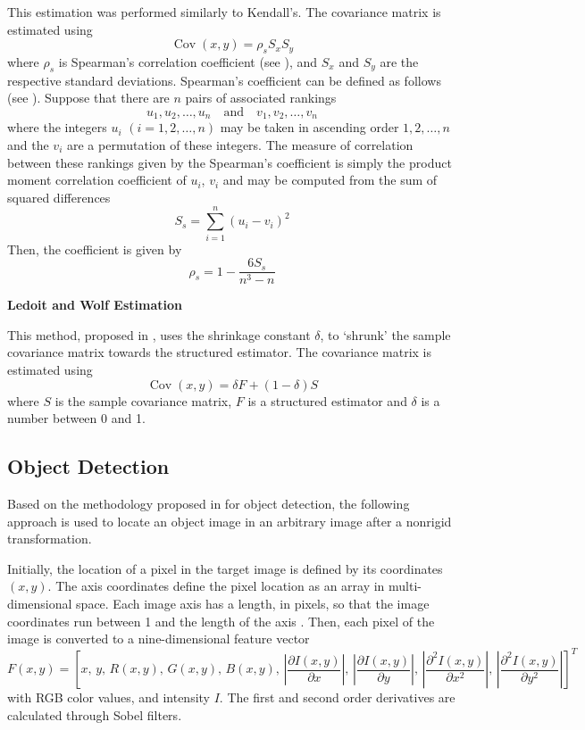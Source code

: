 \documentclass[11pt]{article}
\theoremstyle{definition}
\theoremstyle{remark}
\theoremstyle{remark}
\theoremstyle{remark}
\begin{document}
This estimation was performed similarly to Kendall's. The covariance matrix is
estimated using
%
\[
  \operatorname{Cov}(x, y)=\rho_{s} S_{x} S_{y}
\]
%
where $\rho_{s}$ is Spearman's correlation coefficient (see
\parencite{spearman1961general}), and $S_{x}$ and $S_{y}$ are the respective
standard deviations. Spearman's coefficient can be defined as follows (see
\cite{spearmscoeff}). Suppose that there are $n$ pairs of associated rankings
%
\[
u_{1}, u_{2}, \ldots, u_{n} \quad \text{and} \quad v_{1}, v_{2}, \ldots, v_{n}
\]
%
where the integers $u_{i}$ $(i = 1,2,\ldots,n)$ may be taken in ascending order
$1,2,\ldots,n$ and the $v_{i}$ are a permutation of these integers. The measure
of correlation between these rankings given by the Spearman's coefficient is
simply the product moment correlation coefficient of $u_{i}$, $v_{i}$ and may be
computed from the sum of squared differences
%
\[
  S_{s} = \sum_{i = 1}^{n} (u_{i} - v_{i})^{2}
\]
%
Then, the coefficient is given by
%
\[
\rho_{s} = 1 - \dfrac{6S_{s}}{n^{3} - n}
\]

\textbf{Ledoit and Wolf Estimation}

This method, proposed in \parencite{ledoit2004honey}, uses the shrinkage
constant $\delta$, to ‘shrunk’ the sample covariance matrix towards the
structured estimator. The covariance matrix is estimated using
%
\[
\operatorname{Cov}(x, y)={\delta} F+\left(1-{\delta}\right)S
\]
%
where $S$ is the sample covariance matrix, $F$ is a structured estimator and
$\delta$ is a number between 0 and 1.


\subsection{Object Detection}
Based on the methodology proposed in \parencite{tuzel2006} for object detection,
the following approach is used to locate an object image in an arbitrary image
after a nonrigid transformation.

Initially, the location of a pixel in the target image is defined by its
coordinates $(x,y)$. The axis coordinates define the pixel location as an array
in multi-dimensional space. Each image axis has a length, in pixels, so that the
image coordinates run between 1 and the length of the axis
\parencite{mikhail1984detection}. Then, each pixel of the image is converted to
a nine-dimensional feature vector
%
\begin{equation}
  F(x, y)=\left[x,\, y,\, R(x, y),\, G(x, y),\, B(x, y),\,\left|\frac{\partial I(x, y)}{\partial x}\right|,\,\left|\frac{\partial I(x, y)}{\partial y}\right|,\,\left|\frac{\partial^{2} I(x, y)}{\partial x^{2}}\right|,\,\left|\frac{\partial^{2} I(x, y)}{\partial y^{2}}\right|\right]^{T}
\end{equation}
%
with RGB color values, and intensity $I$. The first and second order derivatives
are calculated through Sobel filters.
\end{document}
